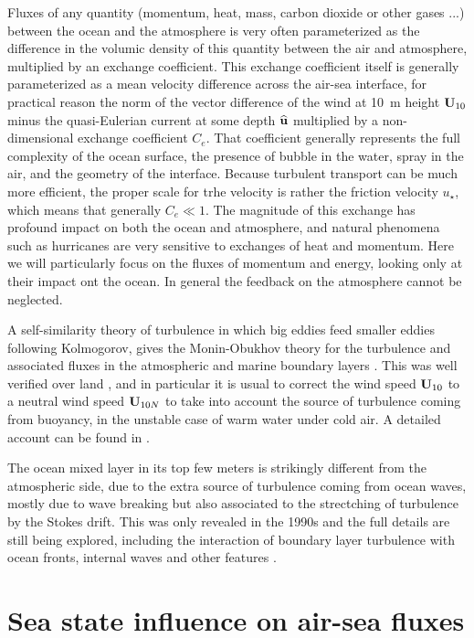 Fluxes of any quantity (momentum, heat, mass, carbon dioxide or other gases ...) between the ocean and the atmosphere is very often parameterized as the difference in the volumic density of this quantity between the air and atmosphere, multiplied by an exchange coefficient. This exchange coefficient itself is generally parameterized as a mean velocity difference across the air-sea interface, for practical reason the norm of the vector difference of the wind at 10~m height $\mathbf{U}_{10}$  minus the quasi-Eulerian current at some depth $\widehat{\mathbf{u}}$ multiplied by a non-dimensional exchange coefficient $C_e$. That coefficient generally represents the full complexity of the ocean surface, the presence of bubble in the water, spray in the air, and the geometry of the interface. Because turbulent transport can be much more efficient, the proper scale for trhe velocity is rather the friction velocity $u_\star$, which means that generally $C_e \ll 1$. The magnitude of this exchange has profound impact on both the ocean and atmosphere, and natural phenomena such as hurricanes are very sensitive to exchanges of heat and momentum.  Here we will particularly focus on the fluxes of momentum and energy, looking only at their impact ont the ocean. In general the feedback on the atmosphere cannot be neglected. 

A self-similarity theory of turbulence in which big eddies feed smaller eddies following Kolmogorov, gives the Monin-Obukhov  theory for the turbulence and associated fluxes in the atmospheric and marine boundary layers \citep{Monin1962,Zilitinkevitch&Chalikov1968}. This was well verified over land \citep{Businger&al.1971}, and in particular it is usual to correct the wind speed  $\mathbf{U}_{10}$ to a neutral wind speed 
$\mathbf{U}_{10N}$ to take into account the source of turbulence coming from buoyancy, in the unstable case of warm water under cold air. A detailed account can be found in \cite{Schlichting1979}. 

The ocean mixed layer in its top few meters is strikingly different from the atmospheric side, due to the extra source of turbulence coming from ocean waves, mostly due to wave breaking but also associated to the strectching of turbulence by the Stokes drift. This was only revealed in the 1990s and the full details are still being explored, including the interaction of boundary layer turbulence with ocean fronts, internal waves  and other features \citep[e.g.][]{Suzuki&al.2016}. 

\section{Sea state influence on air-sea fluxes}


